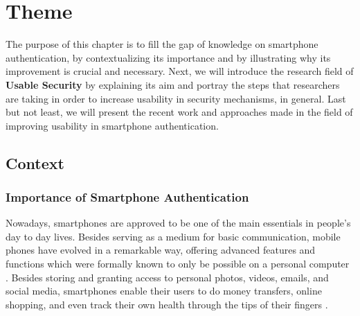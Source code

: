 
\chapter{Theme}\label{ch:second}

The purpose of this chapter is to fill the gap of knowledge on smartphone authentication, by contextualizing its importance and by illustrating why its improvement is crucial and necessary. Next, we will introduce the research field of \textbf{Usable Security} by explaining its aim and portray the steps that researchers are taking in order to increase usability in security mechanisms, in general. Last but not least, we will present the recent work and approaches made in the field of improving usability in smartphone authentication.   

\section{Context}

\subsection{Importance of Smartphone Authentication}

Nowadays, smartphones are approved to be one of the main essentials in people's day to day lives. Besides serving as a medium for basic communication, mobile phones have evolved in a remarkable way, offering advanced features and functions which were formally known to only be possible on a personal computer \cite{Alsaleh}. Besides storing and granting access to personal photos, videos, emails, and social media, smartphones enable their users to do money transfers, online shopping, and even track their own health through the tips of their fingers \cite{Egelman:2014:YRL:2660267.2660273,Albayram:2017:BUL:3235924.3235929,Schloeglhofer}. \\

